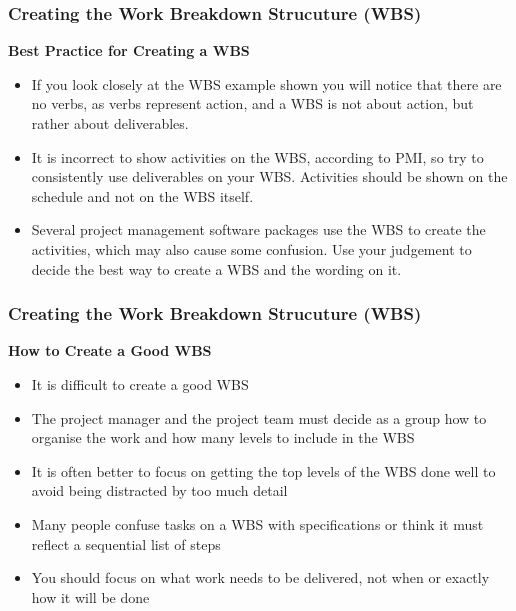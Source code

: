 \documentclass{beamer}
\begin{document}

\begin{frame}
\frametitle{Creating the Work Breakdown Strucuture (WBS)}
\textbf{Best Practice for Creating a WBS}
\vspace{0.5cm}
\begin{itemize}
\item If you look closely at the WBS example shown you will notice that there are no verbs, as verbs represent action, and a WBS is not about action, but rather about deliverables.
\vspace{0.3cm}
\item It is incorrect to show activities on the WBS, according to PMI, so try to consistently use deliverables on your WBS. Activities should be shown on the schedule and not on the WBS itself.
\vspace{0.3cm}
\item Several project management software packages use the WBS to create the activities, which may also cause some confusion. Use your judgement to decide the best way to create a WBS and the wording on it.
\end{itemize}
\end{frame}

\begin{frame}
\frametitle{Creating the Work Breakdown Strucuture (WBS)}
\textbf{How to Create a Good WBS}
\vspace{0.5cm}
\begin{itemize}
\item It is difficult to create a good WBS
\vspace{0.2cm}
\item The project manager and the project team must decide as a group how to organise the work and how many levels to include in the WBS
\vspace{0.2cm}
\item It is often better to focus on getting the top levels of the WBS done well to avoid being distracted by too much detail
\vspace{0.2cm}
\item Many people confuse tasks on a WBS with specifications or think it must reflect a sequential list of steps
\vspace{0.2cm}
\item You should focus on what work needs to be delivered, not when or exactly how it will be done
\end{itemize}
\end{frame}
\end{document}
